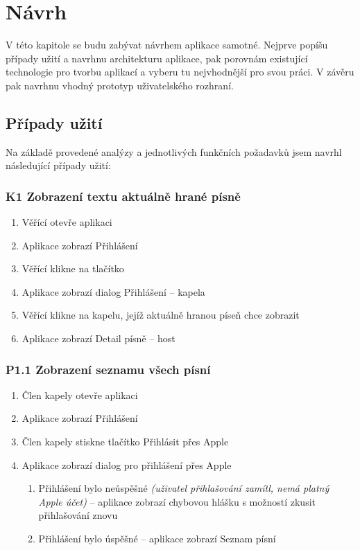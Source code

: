 \chapter{Návrh}

\begin{chapterabstract}
    V této kapitole se budu zabývat návrhem aplikace samotné. Nejprve popíšu případy užití a navrhnu architekturu aplikace, pak porovnám existující technologie pro tvorbu aplikací a vyberu tu nejvhodnější pro svou práci. V závěru pak navrhnu vhodný prototyp uživatelského rozhraní.
\end{chapterabstract}

\section{Případy užití}

Na základě provedené analýzy a jednotlivých funkčních požadavků jsem navrhl následující přípa\-dy užití:

\subsection{K1 Zobrazení textu aktuálně hrané písně}

\begin{enumerate}
    \item Věřící otevře aplikaci
    \item Aplikace zobrazí Přihlášení
    \item Věřící klikne na tlačítko 
    \item Aplikace zobrazí dialog Přihlášení -- kapela
    \item Věřící klikne na kapelu, jejíž aktuálně hranou píseň chce zobrazit
    \item Aplikace zobrazí Detail písně -- host
\end{enumerate}

\subsection{P1.1 Zobrazení seznamu všech písní}
\label{P1.1}

\begin{enumerate}
    \item Člen kapely otevře aplikaci
    \item Aplikace zobrazí Přihlášení
    \item Člen kapely stiskne tlačítko Přihlásit přes Apple
    \item Aplikace zobrazí dialog pro přihlášení přes Apple
    \begin{enumerate}
        \item Přihlášení bylo neúspěšné \emph{(uživatel přihlašování zamítl, nemá platný Apple účet)} -- aplikace zobrazí chybovou hlášku s možností zkusit přihlašování znovu
        \item Přihlášení bylo úspěšné -- aplikace zobrazí Seznam písní
    \end{enumerate}
\end{enumerate}

